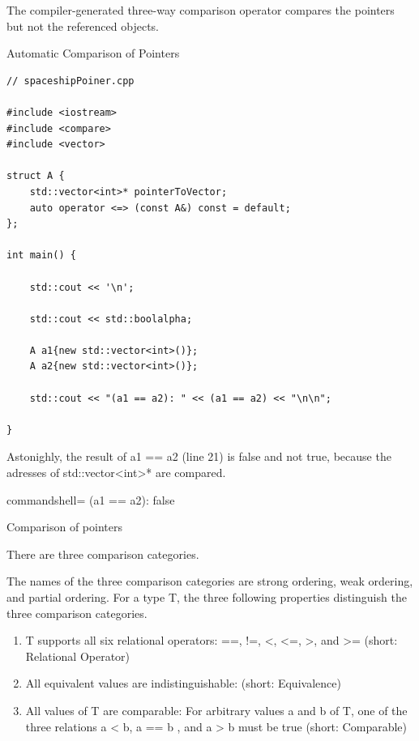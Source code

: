 \begin{tcolorbox}[colback=red!5!white,colframe=red!75!black,title=Automatic Comparision of Pointers]

The compiler-generated three-way comparison operator compares the pointers but not the referenced objects.

\noindent
Automatic Comparison of Pointers
\begin{lstlisting}[style=styleCXX]
// spaceshipPoiner.cpp

#include <iostream>
#include <compare>
#include <vector>

struct A {
	std::vector<int>* pointerToVector;
	auto operator <=> (const A&) const = default;
};

int main() {

	std::cout << '\n';
	
	std::cout << std::boolalpha;
	
	A a1{new std::vector<int>()};
	A a2{new std::vector<int>()};
	
	std::cout << "(a1 == a2): " << (a1 == a2) << "\n\n";

}
\end{lstlisting}

Astonighly, the result of a1 == a2 (line 21) is false and not true, because the adresses of std::vector<int>* are compared.

\begin{tcblisting}{commandshell={}}
(a1 == a2): false
\end{tcblisting}

\begin{center}
Comparison of pointers
\end{center}

\end{tcolorbox}

There are three comparison categories.


The names of the three comparison categories are strong ordering, weak ordering, and partial ordering. For a type T, the three following properties distinguish the three comparison categories.

\begin{enumerate}
\item 
T supports all six relational operators: ==, !=, <, <=, >, and >= (short: Relational Operator)

\item 
All equivalent values are indistinguishable: (short: Equivalence)

\item 
All values of T are comparable: For arbitrary values a and b of T, one of the three relations a < b, a == b , and a > b must be true (short: Comparable)
\end{enumerate}

